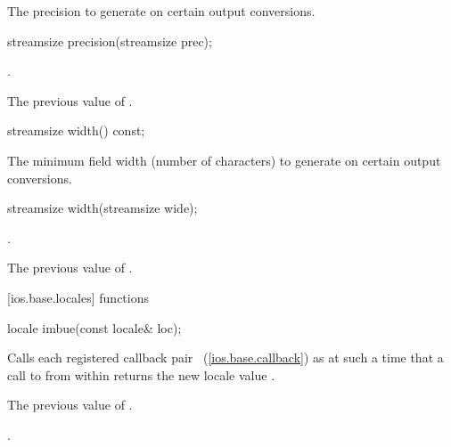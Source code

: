 \begin{itemdescr}
\pnum
\returns
The precision
to generate on certain output conversions.
\end{itemdescr}

%
%
\begin{itemdecl}
streamsize precision(streamsize prec);
\end{itemdecl}

\begin{itemdescr}
\pnum
\postcondition
{}.

\pnum
\returns
The previous value of
.
\end{itemdescr}

%
\begin{itemdecl}
streamsize width() const;
\end{itemdecl}

\begin{itemdescr}
\pnum
\returns
The minimum field width (number of characters) to generate on certain output
conversions.
\end{itemdescr}

%
%
\begin{itemdecl}
streamsize width(streamsize wide);
\end{itemdecl}

\begin{itemdescr}
\pnum
\postcondition
{}.

\pnum
\returns
The previous value of
.
\end{itemdescr}

[ios.base.locales]{ functions}

%
\begin{itemdecl}
locale imbue(const locale& loc);
\end{itemdecl}

\begin{itemdescr}
\pnum
\effects
Calls each registered callback pair
~(\ref{ios.base.callback})
as
at such a time that a call to
from within
returns the new locale value
.

\pnum
\returns
The previous value of
.

\pnum
\postcondition
{}.
\end{itemdescr}


